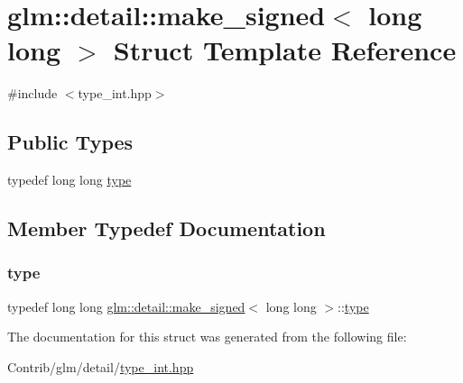 \hypertarget{structglm_1_1detail_1_1make__signed_3_01long_01long_01_4}{}\section{glm\+:\+:detail\+:\+:make\+\_\+signed$<$ long long $>$ Struct Template Reference}
\label{structglm_1_1detail_1_1make__signed_3_01long_01long_01_4}


{\ttfamily \#include $<$type\+\_\+int.\+hpp$>$}

\subsection*{Public Types}
\begin{DoxyCompactItemize}
\item 
typedef long long \mbox{\hyperlink{structglm_1_1detail_1_1make__signed_3_01long_01long_01_4_a109303fc9f5838a2843711c023a57bc8}{type}}
\end{DoxyCompactItemize}


\subsection{Member Typedef Documentation}
\mbox{\label{structglm_1_1detail_1_1make__signed_3_01long_01long_01_4_a109303fc9f5838a2843711c023a57bc8}} 
\subsubsection{\texorpdfstring{type}{type}}
{\footnotesize\ttfamily typedef long long \mbox{\hyperlink{structglm_1_1detail_1_1make__signed}{glm\+::detail\+::make\+\_\+signed}}$<$ long long $>$\+::\mbox{\hyperlink{structglm_1_1detail_1_1make__signed_3_01long_01long_01_4_a109303fc9f5838a2843711c023a57bc8}{type}}}



The documentation for this struct was generated from the following file\+:\begin{DoxyCompactItemize}
\item 
Contrib/glm/detail/\mbox{\hyperlink{type__int_8hpp}{type\+\_\+int.\+hpp}}\end{DoxyCompactItemize}
